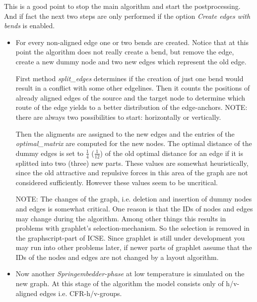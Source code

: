 \documentclass[notitlepage,fleqn]{article}
\begin{document}
\begin{itemize}
{This is a good point to stop the main algorithm and start
the postprocessing. And if fact the next
two steps are only performed if the option {\em Create edges with bends}
is enabled.
}

\begin{itemize}

\item For every non-aligned edge one or two bends are created.
Notice that at this point the algorithm does not really create a bend,
but remove the edge, create a new dummy node and two new edges which
represent the old edge.

First method {\em split\_edges} determines if the creation of just one bend
would result in a conflict with some other edgelines. Then it counts
the positions of already aligned edges of the source 
and the target node to determine which route of the edge yields to
a better distribution of the edge-anchors. NOTE: there are always two
possibilities to start: horizontally or vertically.

Then the aligments are assigned to the new edges and 
the entries of the {\em optimal\_matrix} are computed 
for the new nodes. The optimal distance of the dummy edges
is set to $\frac{1}{4}$ ($\frac{1}{12}$) of the old optimal distance
for an edge if it is splitted
into two (three) new parts. These values are somewhat heuristically,
since the old attractive and repulsive forces in this area of the
graph are not considered sufficiently. However these values seem
to be uncritical.

NOTE: The changes of the graph, i.e. deletion and insertion of 
dummy nodes and edges is somewhat critical. One reason is that
the IDs of nodes and edges may change during the algorithm.
Among other things this results in problems 
with graphlet's selection-mechanism.
So the selection is removed in the graphscript-part of ICSE.
Since graphlet is still under development you may run into
other problems later, if newer parts of graphlet assume that
the IDs of the nodes and edges are not changed by a layout algorithm. 

\item Now another {\em Springembedder-phase} at low temperature 
is simulated on the new graph. 
At this stage of the algorithm the model consists only
of h/v- aligned edges i.e. CFR-h/v-groups.

\end{itemize}

\end{itemize}
\end{document}
